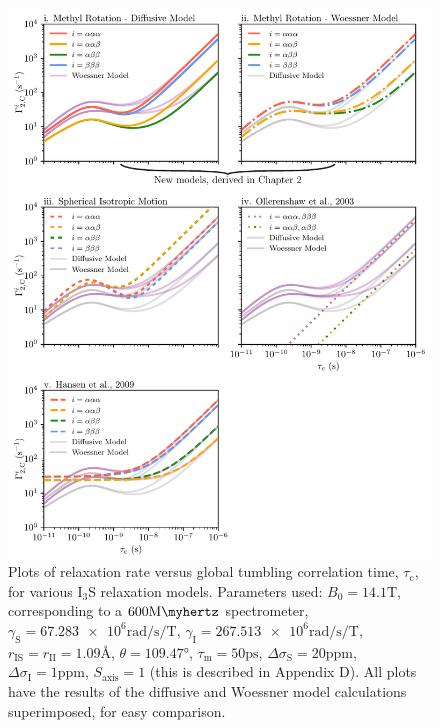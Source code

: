 \begin{figure}
\centering
\includegraphics[scale=1]{./Figures/SimonsFigs/CH3models.pdf}
\caption{%
Plots of relaxation rate versus global tumbling correlation time,
$\tau_{\text{c}}$, for various I$_3$S relaxation models.
Parameters used: $B_0 = \num{14.1} \si{\tesla}$,
corresponding to a $\num{600} \si{\mega\myhertz}$ spectrometer,
$\gamma_{\text{S}} = \num{67.283e6} \si{\radian\per\second\per\tesla}$,
$\gamma_{\text{I}} = \num{267.513e6} \si{\radian\per\second\per\tesla}$,
$r_{\text{IS}} = r_{\text{II}} = \num{1.09} \si{\angstrom}$,
$\theta = \ang{109.47}$,
$\tau_{\text{m}} = \num{50} \si{\pico\second}$,
$\Delta \sigma_{\text{S}} = 20 \text{ppm}$,
$\Delta \sigma_{\text{I}} = 1 \text{ppm}$,
$S_{\text{axis}} = 1$ (this is described in Appendix D).
All plots have the results of the diffusive and Woessner model calculations
superimposed, for easy comparison.
}
\label{CH3Models}
\end{figure}
